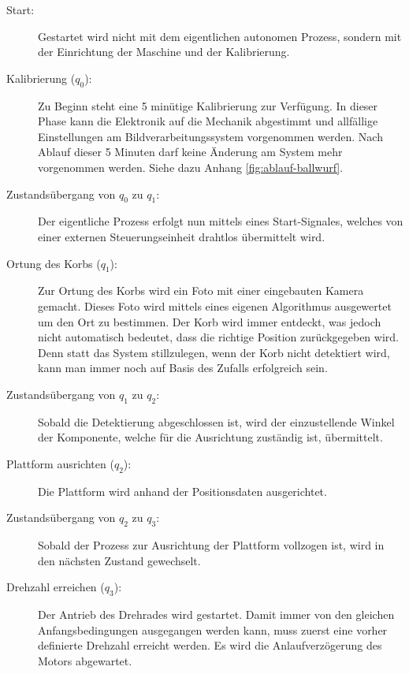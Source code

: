 \begin{description}
	
	\item[Start:] Gestartet wird nicht mit dem eigentlichen autonomen Prozess, sondern mit der Einrichtung der Maschine und der Kalibrierung.
	
	\item[Kalibrierung ($q_{0}$):] Zu Beginn steht eine 5 minütige Kalibrierung zur Verfügung. In dieser Phase kann die Elektronik auf die Mechanik abgestimmt und allfällige Einstellungen am Bildverarbeitungssystem vorgenommen werden. Nach Ablauf dieser 5 Minuten darf keine Änderung am System mehr vorgenommen werden. Siehe dazu Anhang \ref{fig:ablauf-ballwurf}.
	
	\item[Zustandsübergang von $q_{0}$ zu $q_{1}$:] Der eigentliche Prozess erfolgt nun mittels eines Start-Signales, welches von einer externen Steuerungseinheit drahtlos übermittelt wird.
	
	\item[Ortung des Korbs ($q_{1}$):] Zur Ortung des Korbs wird ein Foto mit einer eingebauten Kamera gemacht. Dieses Foto wird mittels eines eigenen Algorithmus ausgewertet um den Ort zu bestimmen. Der Korb wird immer entdeckt, was jedoch nicht automatisch bedeutet, dass die richtige Position zurückgegeben wird. Denn statt das System stillzulegen, wenn der Korb nicht detektiert wird, kann man immer noch auf Basis des Zufalls erfolgreich sein.
	
	\item[Zustandsübergang von $q_{1}$ zu $q_{2}$:]	Sobald die Detektierung abgeschlossen ist, wird der einzustellende Winkel der Komponente, welche für die Ausrichtung zuständig ist, übermittelt.
	
	\item[Plattform ausrichten ($q_{2}$):] Die Plattform wird anhand der Positionsdaten ausgerichtet.
	
	\item[Zustandsübergang von $q_{2}$ zu $q_{3}$:] Sobald der Prozess zur Ausrichtung der Plattform vollzogen ist, wird in den nächsten Zustand gewechselt.
	
	\item[Drehzahl erreichen ($q_{3}$):] Der Antrieb des Drehrades wird gestartet. Damit immer von den gleichen Anfangsbedingungen ausgegangen werden kann, muss zuerst eine vorher definierte Drehzahl erreicht werden. Es wird die Anlaufverzögerung des Motors abgewartet.
		

\end{description}
